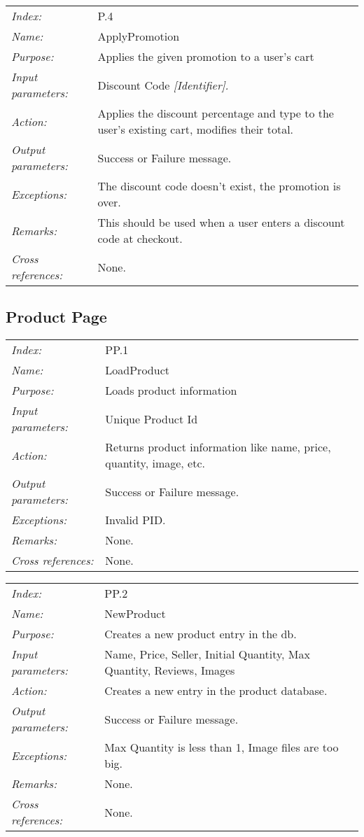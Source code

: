 \documentclass[10pt,letter]{article}
\begin{document}
\begin{tabularx}{\textwidth}{l X}
    \it{Index:} & P.4 \\
    \it{Name:} & ApplyPromotion \\
    \it{Purpose:} & Applies the given promotion to a user's cart \\
    \it{Input parameters:} & Discount Code \it{[Identifier]}.\\
    \it{Action:} & Applies the discount percentage and type to the user's existing cart, modifies their total.\\
    \it{Output parameters:} & Success or Failure message. \\
    \it{Exceptions:} & The discount code doesn't exist, the promotion is over. \\
    \it{Remarks:} & This should be used when a user enters a discount code at checkout.\\
    \it{Cross references:} & None. \\
    \hline
\end{tabularx}

\subsection{Product Page}

\begin{tabularx}{\textwidth}{l X}
    \it{Index:} & PP.1 \\
    \it{Name:} & LoadProduct \\
    \it{Purpose:} & Loads product information \\
    \it{Input parameters:} & Unique Product Id\\
    \it{Action:} & Returns product information like name, price, quantity, image, etc.\\
    \it{Output parameters:} & Success or Failure message. \\
    \it{Exceptions:} & Invalid PID. \\
    \it{Remarks:} & None. \\
    \it{Cross references:} & None. \\
    \hline
\end{tabularx}

\begin{tabularx}{\textwidth}{l X}
    \it{Index:} & PP.2 \\
    \it{Name:} & NewProduct \\
    \it{Purpose:} & Creates a new product entry in the db.\\
    \it{Input parameters:} & Name, Price, Seller, Initial Quantity, Max Quantity, Reviews, Images\\
    \it{Action:} & Creates a new entry in the product database.\\
    \it{Output parameters:} & Success or Failure message. \\
    \it{Exceptions:} & Max Quantity is less than 1, Image files are too big. \\
    \it{Remarks:} & None. \\
    \it{Cross references:} & None. \\
    \hline
\end{tabularx}
\end{document}
